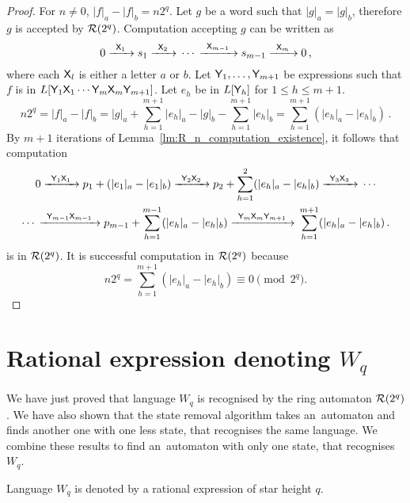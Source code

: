 \begin{proof}
    For $n \neq 0$, $|f|_a - |f|_b = n 2^q$. Let $g$ be a word such that $|g|_a = |g|_b$, therefore $g$ is accepted by ${\mathcal{R}}(2^q)$. Computation accepting $g$ can be written as
    \[
        0 {\; \xrightarrow[]{\: \; {\mathsf{X}}_1 \: \;} \;} s_1 {\; \xrightarrow[]{\: \; {\mathsf{X}}_2 \: \;} \;} \dotsb {\; \xrightarrow[]{\: \; {\mathsf{X}}_{m-1} \: \;} \;} s_{m-1} {\; \xrightarrow[]{\: \; {\mathsf{X}}_m \: \;} \;} 0 \, ,
    \]
    where each ${\mathsf{X}}_l$ is either a letter $a$ or $b$. Let ${\mathsf{Y}}_1, \dotsc, {\mathsf{Y}}_{m+1}$ be expressions such that $f$ is in $L[{\mathsf{Y}}_1 {\mathsf{X}}_1 \dotsm {\mathsf{Y}}_m {\mathsf{X}}_m {\mathsf{Y}}_{m+1}]$. Let $e_h$ be in $L[{\mathsf{Y}}_h]$ for $1 \leq h \leq m+1$.
    \[
        n 2^q = |f|_a - |f|_b = |g|_a + \sum_{h=1}^{m+1} |e_h|_a - |g|_b - \sum_{h=1}^{m+1} |e_h|_b = \sum_{h=1}^{m+1} (|e_h|_a - |e_h|_b) \, .
    \]
    By $m + 1$ iterations of Lemma~\ref*{lm:R_n_computation_existence}, it follows that computation
    \begin{multline*}
        0 {\; \xrightarrow[]{\: \; {\mathsf{Y}}_1 {\mathsf{X}}_1 \: \;} \;} p_1 + (|e_1|_a - |e_1|_b) {\; \xrightarrow[]{\: \; {\mathsf{Y}}_2 {\mathsf{X}}_2 \: \;} \;} p_2 + \sum_{h=1}^{2} (|e_h|_a - |e_h|_b) {\; \xrightarrow[]{\: \; {\mathsf{Y}}_3 {\mathsf{X}}_3 \: \;} \;} \dotsb \\
        \dotsb {\; \xrightarrow[]{\: \; {\mathsf{Y}}_{m-1} {\mathsf{X}}_{m-1} \: \;} \;} p_{m-1} + \sum_{h=1}^{m-1} (|e_h|_a - |e_h|_b) {\; \xrightarrow[]{\: \; {\mathsf{Y}}_m {\mathsf{X}}_m {\mathsf{Y}}_{m+1} \: \;} \;} \sum_{h=1}^{m+1} (|e_h|_a - |e_h|_b) \, .
    \end{multline*}
    is in ${\mathcal{R}}(2^q)$. It is successful computation in ${\mathcal{R}}(2^q)$ because
    \[
        n 2^q = \sum_{h=1}^{m+1} (|e_h|_a - |e_h|_b) \equiv 0 \pmod{2^q}.
    \]
\end{proof}

\section{Rational expression denoting $W_q$}\label{section:rational_expression_denoting_W_q}

We have just proved that language $W_q$ is recognised by the ring automaton ${\mathcal{R}}(2^q)$. We have also shown that the state removal algorithm takes an~automaton and finds another one with one less state, that recognises the same language. We combine these results to find an~automaton with only one state, that recognises $W_q$.

\begin{lemma}\label{lm:expression_existence}
    Language $W_q$ is denoted by a rational expression of star height $q$.
\end{lemma}

